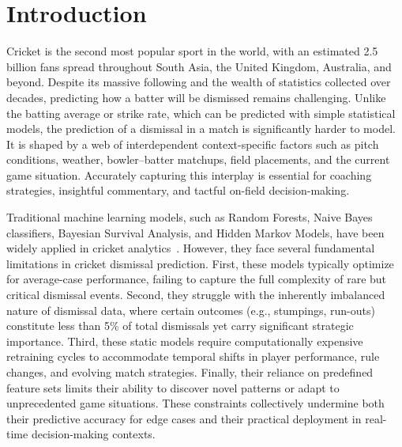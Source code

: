 \documentclass[sigconf,anonymous,review]{acmart}
\begin{document}


\maketitle

\section{Introduction}
Cricket is the second most popular sport in the world, with an estimated 2.5 billion fans spread throughout South Asia, the United Kingdom, Australia, and beyond. Despite its massive following and the wealth of statistics collected over decades, predicting how a batter will be dismissed remains challenging. Unlike the batting average or strike rate, which can be predicted with simple statistical models, the prediction of a dismissal in a match is significantly harder to model. It is shaped by a web of interdependent context-specific factors such as pitch conditions, weather, bowler–batter matchups, field placements, and the current game situation. Accurately capturing this interplay is essential for coaching strategies, insightful commentary, and tactful on-field decision-making.

Traditional machine learning models, such as Random Forests, Naive Bayes classifiers, Bayesian Survival Analysis, and Hidden Markov Models, have been widely applied in cricket analytics~\cite{cricket_analytics_survey,cricket_dismissal_traditional,sports_data_mining}. However, they face several fundamental limitations in cricket dismissal prediction. First, these models typically optimize for average-case performance, failing to capture the full complexity of rare but critical dismissal events. Second, they struggle with the inherently imbalanced nature of dismissal data, where certain outcomes (e.g., stumpings, run-outs) constitute less than 5\% of total dismissals yet carry significant strategic importance. Third, these static models require computationally expensive retraining cycles to accommodate temporal shifts in player performance, rule changes, and evolving match strategies. Finally, their reliance on predefined feature sets limits their ability to discover novel patterns or adapt to unprecedented game situations. These constraints collectively undermine both their predictive accuracy for edge cases and their practical deployment in real-time decision-making contexts.
\end{document}
